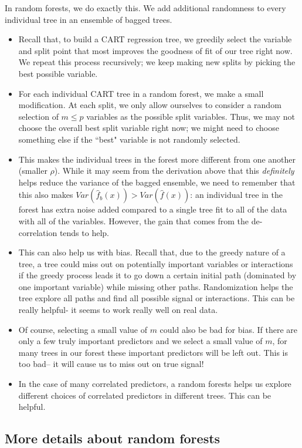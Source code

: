 In random forests, we do exactly this. We add additional randomness to every individual tree in an ensemble of bagged trees.
\begin{itemize}
\item Recall that, to build a CART regression tree, we greedily select the variable and split point that most improves the goodness of fit of our tree right now. We repeat this process recursively; we keep making new splits by picking the best possible variable. 
\item For each individual CART tree in a random forest, we make a small modification. At each split, we only allow ourselves to consider a random selection of $m \leq p$ variables as the possible split variables. Thus, we may not choose the overall best split variable right now; we might need to choose something else if the ``best" variable is not randomly selected. 
\item This makes the individual trees in the forest more different from one another (smaller $\rho$). While it may seem from the derivation above that this \emph{definitely} helps reduce the variance of the bagged ensemble, we need to remember that this also makes   $Var(\hat{f}_b(x)) > Var(\hat{f}(x))$: an individual tree in the forest has extra noise added compared to a single tree fit to all of the data with all of the variables. However, the gain that comes from the de-correlation tends to help.
\item This can also help us with bias. Recall that, due to the greedy nature of a tree, a tree could miss out on potentially important variables or interactions if the greedy process leads it to go down a certain initial path (dominated by one important variable) while missing other paths. Randomization helps the tree explore all paths and find all possible signal or interactions. This can be really helpful- it seems to work really well on real data. 
\item Of course, selecting a small value of $m$ could also be bad for bias. If there are only a few truly important predictors and we select a small value of $m$, for many trees in our forest these important predictors will be left out. This is too bad-- it will cause us to miss out on true signal!
\item In the case of many correlated predictors, a random forests helps us explore different choices of correlated predictors in different trees. This can be helpful. 
\end{itemize}

\subsection{More details about random forests}

